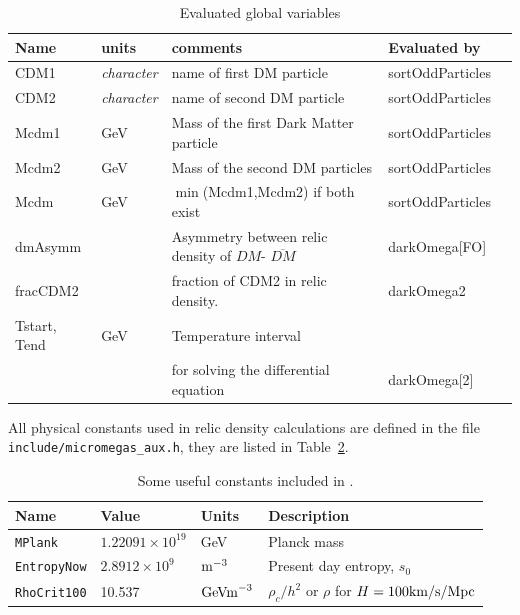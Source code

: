 \documentclass[12pt,a4paper]{article}
\begin{document}
\begin{table}[htbp]
 \caption{Evaluated global  variables}
 \label{paramTabEval}
\begin{center}
\begin{tabular}{|l|l|l|l|l|}
\hline
  Name      & units          & comments                                       & Evaluated by      \\  \hline
  CDM1      &{\it character} & name of first DM particle                 & sortOddParticles  \\     
  CDM2      &{\it character} &  name of second  DM particle             & sortOddParticles  \\
  Mcdm1     &  GeV           & Mass of the first Dark Matter particle         & sortOddParticles  \\ 
  Mcdm2     &  GeV           & Mass of the second DM particles                & sortOddParticles  \\
  Mcdm      &  GeV           & $\min$(Mcdm1,Mcdm2) if both exist              & sortOddParticles  \\
  dmAsymm   &                & Asymmetry between relic density of ${DM}$- $\overline{DM}$ & darkOmega[FO]\\
  fracCDM2  &                & fraction of CDM2 in relic density.             & darkOmega2\\
  Tstart, Tend &   GeV       & Temperature interval& \\
&&   for solving the differential equation     &  darkOmega[2]\\  
\hline
\end{tabular}
\end{center}
\end{table}


All physical constants used in relic density calculations are defined  in the  file \\
\verb|include/micromegas_aux.h|,  they   are listed in Table~\ref{tab:constants}.

\begin{table}[h]
\caption{Some useful constants included in \micro.}
\label{tab:constants}
\begin{tabular}{llll}
\hline
Name & Value & Units & Description\\\hline
\verb|MPlank| &     $1.22091\times 10^{19}$  &  GeV & Planck mass    \\
\verb|EntropyNow| &  $2.8912\times 10^{9}$    & ${\rm m}^{-3}$ & Present day entropy, $s_0$     \\
\verb|RhoCrit100| & 10.537     & ${\rm GeV m}^{-3}$  & $\rho_c/h^2$  or $\rho$ for $H=100 {\rm km/s/Mpc}$ \\\hline
\end{tabular}
\end{table}
\end{document}
